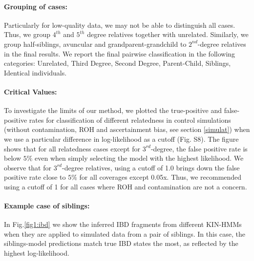 \documentclass[12pt, letterpaper]{article}
\begin{document}
\paragraph{Grouping of cases:}
Particularly for low-quality data, we may not be able to distinguish all cases. Thus, we group $4^{th}$ and $5^{th}$ degree relatives together with unrelated. Similarly, we group  half-siblings, avuncular and grandparent-grandchild to  $2^{nd}$-degree relatives in the final results. We report the final pairwise classification in the following categories: Unrelated, Third Degree, Second Degree, Parent-Child, Siblings, Identical individuals.


\paragraph{Critical Values:}
 
To investigate the limits of our method, we plotted the true-positive and false-positive rates for classification of different relatedness in control simulations (without contamination, ROH and ascertainment bias, see section \ref{simulat}) when we use a particular difference in log-likelihood as a cutoff (Fig. S8). The figure shows that for all relatedness cases except for $3^{rd}$-degree, the false positive rate is below $5\%$ even when simply selecting the model with the highest likelihood. We observe that for $3^{rd}$-degree relatives, using a cutoff of 1.0 brings down the false positive rate close to $5\%$ for all coverages except 0.05x. Thus, we recommended using a cutoff of 1 for all cases where ROH and contamination are not a concern.


\paragraph{Example case of siblings:}
In Fig.\ref{fig1:ibd} we show the inferred IBD fragments from different KIN-HMMs when they are applied to simulated data from a pair of siblings. In this case, the siblings-model predictions match true IBD states the most, as reflected by the highest log-likelihood. 
\end{document}
